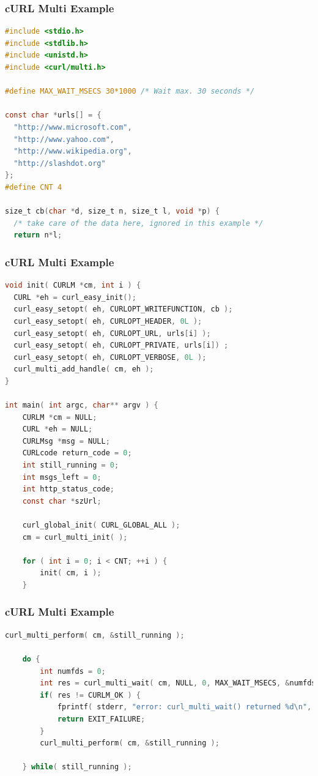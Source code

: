 \begin{frame}[fragile]
\frametitle{cURL Multi Example}

\begin{lstlisting}[language=C]
#include <stdio.h>
#include <stdlib.h>
#include <unistd.h>
#include <curl/multi.h>

#define MAX_WAIT_MSECS 30*1000 /* Wait max. 30 seconds */

const char *urls[] = {
  "http://www.microsoft.com",
  "http://www.yahoo.com",
  "http://www.wikipedia.org",
  "http://slashdot.org"
};
#define CNT 4

size_t cb(char *d, size_t n, size_t l, void *p) {
  /* take care of the data here, ignored in this example */
  return n*l;
\end{lstlisting}

\end{frame}

\begin{frame}[fragile]
\frametitle{cURL Multi Example}

\begin{lstlisting}[language=C]
void init( CURLM *cm, int i ) {
  CURL *eh = curl_easy_init();
  curl_easy_setopt( eh, CURLOPT_WRITEFUNCTION, cb );
  curl_easy_setopt( eh, CURLOPT_HEADER, 0L );
  curl_easy_setopt( eh, CURLOPT_URL, urls[i] );
  curl_easy_setopt( eh, CURLOPT_PRIVATE, urls[i]) ;
  curl_easy_setopt( eh, CURLOPT_VERBOSE, 0L );
  curl_multi_add_handle( cm, eh );
}

int main( int argc, char** argv ) {
    CURLM *cm = NULL;
    CURL *eh = NULL;
    CURLMsg *msg = NULL;
    CURLcode return_code = 0;
    int still_running = 0; 
    int msgs_left = 0;
    int http_status_code;
    const char *szUrl;

    curl_global_init( CURL_GLOBAL_ALL );
    cm = curl_multi_init( );
    
    for ( int i = 0; i < CNT; ++i ) {
        init( cm, i );
    }
\end{lstlisting}

\end{frame}

\begin{frame}[fragile]
\frametitle{cURL Multi Example}

\begin{lstlisting}[language=C]
    curl_multi_perform( cm, &still_running );

    do {
        int numfds = 0;
        int res = curl_multi_wait( cm, NULL, 0, MAX_WAIT_MSECS, &numfds );
        if( res != CURLM_OK ) {
            fprintf( stderr, "error: curl_multi_wait() returned %d\n", res );
            return EXIT_FAILURE;
        }
        curl_multi_perform( cm, &still_running );

    } while( still_running );
\end{lstlisting}

\end{frame}

